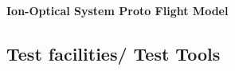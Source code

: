 		

		
		\textbf{Ion-Optical System Proto Flight Model}\\
		
	
	
	\subsection{Test facilities/ Test Tools }\label{subsec:setupTestTools} %
	

